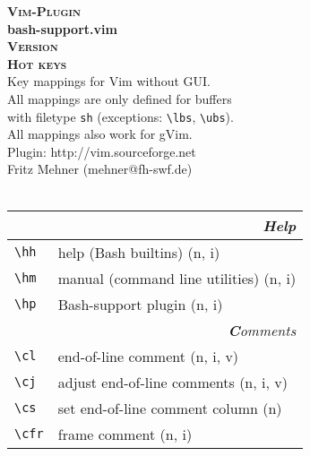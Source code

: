 \documentclass[oneside,12pt,a4paper,DIV18]{scrartcl}
\begin{document}
\begin{center}
\textbf{\textsc{\small{Vim-Plugin}}}\\
\textbf{\large{bash-support.vim}}\\
\textbf{\textsc{\small{Version \PluginVersion}}}\\
\vspace{5mm}%
\textbf{\textsc{\huge{Hot keys}}}\\ 
\vspace{5mm}%
\footnotesize{Key mappings for Vim without GUI.}\\
\vspace{1mm}%
\footnotesize{
All mappings are only defined for buffers\\
with filetype \texttt{sh} (exceptions: \verb'\lbs',  \verb'\ubs').\\
All mappings also work for gVim.}\\ 
\vspace{1mm}%
\footnotesize{Plugin: http://vim.sourceforge.net}\\
\footnotesize{Fritz Mehner (mehner@fh-swf.de)}\\
\footnotesize{\ReleaseDate}\\
\vspace{3.5mm}
\small
\begin{tabular}[]{|p{11mm}|p{59mm}|}
\hline 
\multicolumn{2}{|r|}{\textsl{\textbf{H}elp}} \\
\hline \verb'\hh'  & help (Bash builtins)             \hfill (n, i) \\
\hline \verb'\hm'  & manual (command line utilities) \hfill (n, i) \\
\hline \verb'\hp'  & Bash-support plugin              \hfill (n, i) \\
\hline
\hline 
\hline
\multicolumn{2}{|r|}{\textsl{\textbf{C}omments}} \\
\hline \verb'\cl'  & end-of-line comment              \hfill (n, i, v) \\
\hline \verb'\cj'  & adjust end-of-line comments      \hfill (n, i, v) \\
\hline \verb'\cs'  & set end-of-line comment column   \hfill (n) \\
\hline \verb'\cfr' & frame comment                    \hfill (n, i) \\

\end{tabular}
\end{center}
\end{document}
